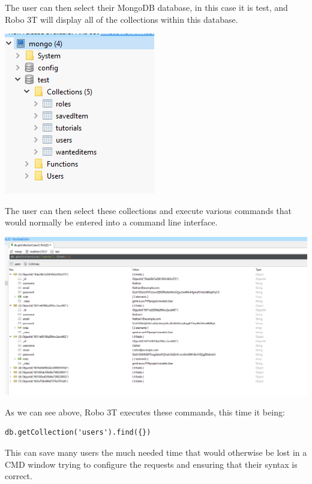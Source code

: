 The user can then select their MongoDB database, in this case it is test, and Robo 3T will display all of the collections within this database. \par
\includegraphics[]{img/robo-collections.PNG} \par
The user can then select these collections and execute various commands that would normally be entered into a command line interface. \par
\includegraphics[scale=0.4]{img/robo-users.PNG} \par
As we can see above, Robo 3T executes these commands, this time it being: 
\begin{verbatim}
db.getCollection('users').find({})
\end{verbatim}
This can save many users the much needed time that would otherwise be lost in a CMD window trying to configure the requests and ensuring that their syntax is correct.


